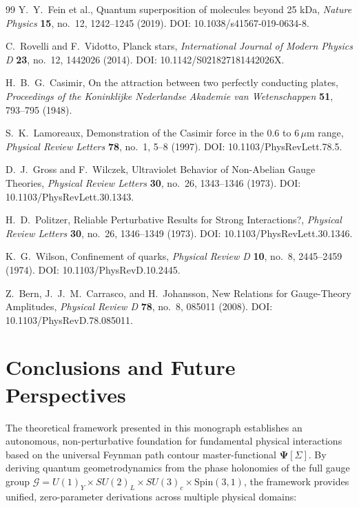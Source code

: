 \documentclass[11pt,a4paper]{article}
\theoremstyle{definition}
\begin{document}
\begin{thebibliography}{99}
Y.~Y.~Fein et al., Quantum superposition of molecules beyond 25 kDa, \textit{Nature Physics} \textbf{15}, no.~12, 1242--1245 (2019). DOI: 10.1038/s41567-019-0634-8.

C.~Rovelli and F.~Vidotto, Planck stars, \textit{International Journal of Modern Physics D} \textbf{23}, no.~12, 1442026 (2014). DOI: 10.1142/S021827181442026X.

H.~B.~G.~Casimir, On the attraction between two perfectly conducting plates, \textit{Proceedings of the Koninklijke Nederlandse Akademie van Wetenschappen} \textbf{51}, 793--795 (1948).

S.~K.~Lamoreaux, Demonstration of the Casimir force in the 0.6 to $6\,\mu\text{m}$ range, \textit{Physical Review Letters} \textbf{78}, no.~1, 5--8 (1997). DOI: 10.1103/PhysRevLett.78.5.

D.~J.~Gross and F.~Wilczek, Ultraviolet Behavior of Non-Abelian Gauge Theories, \textit{Physical Review Letters} \textbf{30}, no.~26, 1343--1346 (1973). DOI: 10.1103/PhysRevLett.30.1343.

H.~D.~Politzer, Reliable Perturbative Results for Strong Interactions?, \textit{Physical Review Letters} \textbf{30}, no.~26, 1346--1349 (1973). DOI: 10.1103/PhysRevLett.30.1346.

K.~G.~Wilson, Confinement of quarks, \textit{Physical Review D} \textbf{10}, no.~8, 2445--2459 (1974). DOI: 10.1103/PhysRevD.10.2445.

Z.~Bern, J.~J.~M.~Carrasco, and H.~Johansson, New Relations for Gauge-Theory Amplitudes, \textit{Physical Review D} \textbf{78}, no.~8, 085011 (2008). DOI: 10.1103/PhysRevD.78.085011.

\end{thebibliography}

\clearpage
\section*{Conclusions and Future Perspectives}

The theoretical framework presented in this monograph establishes an autonomous, non-perturbative foundation for fundamental physical interactions based on the universal Feynman path contour master-functional $\mathbf{\Psi}[\Sigma]$. By deriving quantum geometrodynamics from the phase holonomies of the full gauge group $\mathcal{G} = U(1)_Y \times SU(2)_L \times SU(3)_c \times \mathrm{Spin}(3,1)$, the framework provides unified, zero-parameter derivations across multiple physical domains:
\end{document}
